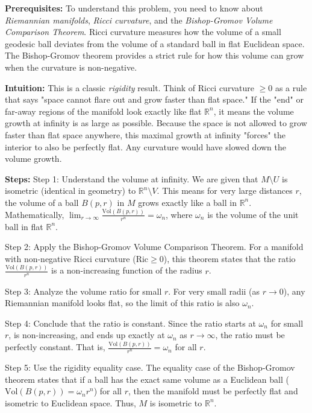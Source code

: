 \begin{solution}
\textbf{Prerequisites:}
To understand this problem, you need to know about \textit{Riemannian manifolds}, \textit{Ricci curvature}, and the \textit{Bishop-Gromov Volume Comparison Theorem}. Ricci curvature measures how the volume of a small geodesic ball deviates from the volume of a standard ball in flat Euclidean space. The Bishop-Gromov theorem provides a strict rule for how this volume can grow when the curvature is non-negative.

\vspace{\baselineskip}
\textbf{Intuition:}
This is a classic \textit{rigidity} result. Think of Ricci curvature $\geq 0$ as a rule that says "space cannot flare out and grow faster than flat space." If the "end" or far-away regions of the manifold look exactly like flat $\mathbb{R}^n$, it means the volume growth at infinity is as large as possible. Because the space is not allowed to grow faster than flat space anywhere, this maximal growth at infinity "forces" the interior to also be perfectly flat. Any curvature would have slowed down the volume growth.

\vspace{\baselineskip}
\textbf{Steps:}
Step 1: Understand the volume at infinity. We are given that $M \setminus U$ is isometric (identical in geometry) to $\mathbb{R}^n \setminus V$. This means for very large distances $r$, the volume of a ball $B(p, r)$ in $M$ grows exactly like a ball in $\mathbb{R}^n$. Mathematically, $\lim_{r \to \infty} \frac{\text{Vol}(B(p, r))}{r^n} = \omega_n$, where $\omega_n$ is the volume of the unit ball in flat $\mathbb{R}^n$.

Step 2: Apply the Bishop-Gromov Volume Comparison Theorem. For a manifold with non-negative Ricci curvature ($\text{Ric} \geq 0$), this theorem states that the ratio $\frac{\text{Vol}(B(p, r))}{r^n}$ is a non-increasing function of the radius $r$.

Step 3: Analyze the volume ratio for small $r$. For very small radii (as $r \to 0$), any Riemannian manifold looks flat, so the limit of this ratio is also $\omega_n$.

Step 4: Conclude that the ratio is constant. Since the ratio starts at $\omega_n$ for small $r$, is non-increasing, and ends up exactly at $\omega_n$ as $r \to \infty$, the ratio must be perfectly constant. That is, $\frac{\text{Vol}(B(p, r))}{r^n} = \omega_n$ for all $r$.

Step 5: Use the rigidity equality case. The equality case of the Bishop-Gromov theorem states that if a ball has the exact same volume as a Euclidean ball ($\text{Vol}(B(p, r)) = \omega_n r^n$) for all $r$, then the manifold must be perfectly flat and isometric to Euclidean space. Thus, $M$ is isometric to $\mathbb{R}^n$.
\end{solution}

